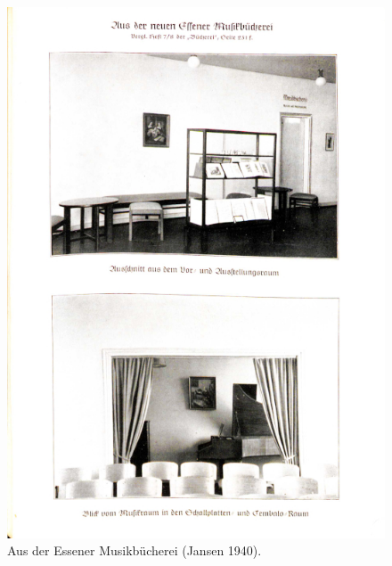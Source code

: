\documentclass[a4paper,
fontsize=11pt,
oneside,
numbers=noperiodatend,
parskip=half-,
bibliography=totoc,
final
]{scrartcl}
\begin{document}
\begin{figure}
\centering
\includegraphics{files/Jansen_1940.jpg}
\caption{Aus der Essener Musikbücherei (Jansen 1940).}
\end{figure}
\end{document}

